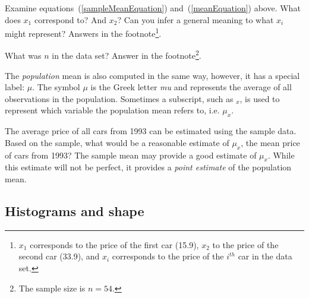 \begin{exercise}
Examine equations~(\ref{sampleMeanEquation}) and~(\ref{meanEquation}) above. What does $x_1$ correspond to? And $x_2$? Can you infer a general meaning to what $x_i$ might represent? Answers in the footnote\footnote{$x_1$ corresponds to the price of the first car (15.9), $x_2$ to the price of the second car (33.9), and $x_i$ corresponds to the price of the $i^{th}$ car in the data set.}.
\end{exercise}

\begin{exercise}
What was $n$ in the  data set? Answer in the footnote\footnote{The sample size is $n=54$.}.
\end{exercise}

The \emph{population} mean is also computed in the same way, however, it has a special label: $\mu$. The symbol $\mu$ is the Greek letter \emph{mu} and represents the average of all observations in the population. Sometimes a subscript, such as $_x$, is used to represent which variable the population mean refers to, i.e. $\mu_x$.

\begin{example}{The average price of all cars from 1993 can be estimated using the sample data. Based on the  sample, what would be a reasonable estimate of $\mu_x$, the mean price of cars from 1993?}
The sample mean may provide a good estimate of $\mu_x$. While this estimate will not be perfect, it provides a \emph{point estimate} of the population mean.
\end{example}

\subsection{Histograms and shape}
\label{histogramsAndShape}

